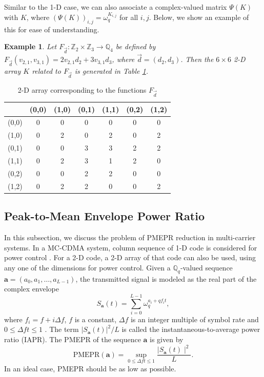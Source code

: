 \documentclass[pdflatex,sn-mathphys-num]{sn-jnl}%
\theoremstyle{thmstyleone}
\newtheorem{example}{Example}
\begin{document}
	Similar to the 1-D case, we can also associate a complex-valued matrix $\Psi(K)$ with $K$, where $\left( \Psi(K) \right)_{i,j}= \omega_q^{K_{i,j}}$ for all $i,j$. Below, we show an example of this for ease of understanding.
	
	
	\begin{example}
		Let $F_{ \vec{d}}: \mathbb{Z}_{2} \times \mathbb{Z}_{3}  \rightarrow \mathbb{Q}_4$ be defined by  $F_{ \vec{d}} (v_{2,1}, v_{3,1})= 2 v_{2,1} d_2 + 3 v_{3,1} d_3$, where $\vec{d}= (d_2, d_3)$. Then the $6 \times 6$ 2-D array $K$ related to $F_{\vec{d}}$ is generated in Table \ref{table_array_generate}.
	\end{example}
	
	\begin{table}[h]
		\caption{2-D array corresponding to the functions $F_{\vec{d}}$ }
		\label{table_array_generate}
		\centering
		\begin{tabular}{|c|cccccc|}
			\hline
			\diagbox{$\vec{d}= (d_2, d_3)$}{ $(v_{2,1}, v_{3,1}$)} & (0,0)& (1,0)& (0,1)& (1,1)& (0,2)& (1,2)\\ 
			\hline
			(0,0)& 0& 0& 0& 0& 0& 0\\ 
			(1,0)& 0& 2& 0& 2& 0& 2\\ 
			(0,1)& 0& 0& 3& 3& 2& 2\\ 
			(1,1)& 0& 2& 3& 1& 2& 0\\ 
			(0,2)& 0& 0& 2& 2& 0& 0\\ 
			(1,2)& 0& 2& 2& 0& 0& 2\\ 
			\hline
		\end{tabular}
	\end{table}
	
	
	\subsection{Peak-to-Mean Envelope Power Ratio}
	In this subsection, we discuss the problem of PMEPR reduction in multi-carrier systems. In a MC-CDMA system, column sequence of 1-D code is considered for power control \cite{LiuMCCDMA}. For a 2-D code, a 2-D array of that code can also be used, using any one of the dimensions for power control. Given a $\mathbb{Q}_q$-valued sequence $\mathbf{a}= (a_0, a_1, \dots, a_{L-1} )$, the transmitted signal is modeled as the real part of the complex envelope
	\begin{equation}
		S_{\mathbf{a}} (t)= \sum_{i=0}^{L-1} \omega_q^{a_i + q f_i t},
	\end{equation}
	where  $f_i= f + i \Delta f$, $f$ is a constant, $\Delta f$ is an integer multiple of symbol rate and $0 \leq \Delta f t \leq 1$ \cite{DavisJedwab}.  The term $\left|  S_{\mathbf{a}} (t)  \right|^2/L$ is called the instantaneous-to-average power ratio (IAPR).
	The PMEPR of the sequence $\mathbf{a}$ is given by
	\begin{equation}
		\text{PMEPR}(\mathbf{a})= \sup \limits_{0 \leq \Delta f t \leq 1} \frac{\mid S_{\mathbf{a}} (t) \mid ^2 }{L}.
	\end{equation}
	In an ideal case, PMEPR should be as low as possible.
	
\end{document}
